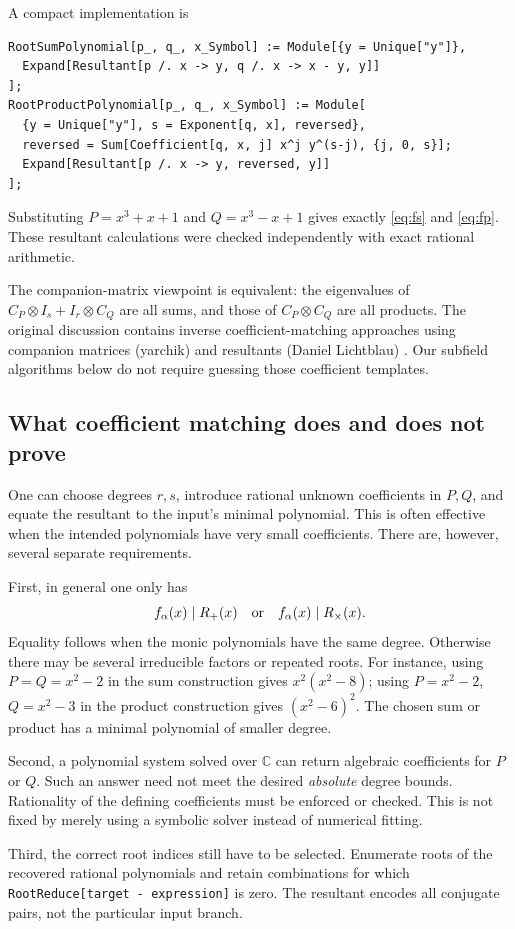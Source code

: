 \documentclass[11pt,letterpaper]{article}
\theoremstyle{definition}
\theoremstyle{remark}
\newcommand{\C}{\mathbb C}
\newcommand{\wl}[1]{\texttt{#1}}
\begin{document}
A compact implementation is
\begin{lstlisting}
RootSumPolynomial[p_, q_, x_Symbol] := Module[{y = Unique["y"]},
  Expand[Resultant[p /. x -> y, q /. x -> x - y, y]]
];
RootProductPolynomial[p_, q_, x_Symbol] := Module[
  {y = Unique["y"], s = Exponent[q, x], reversed},
  reversed = Sum[Coefficient[q, x, j] x^j y^(s-j), {j, 0, s}];
  Expand[Resultant[p /. x -> y, reversed, y]]
];
\end{lstlisting}
Substituting \(P=x^3+x+1\) and \(Q=x^3-x+1\) gives exactly
\eqref{eq:fs} and \eqref{eq:fp}. These resultant calculations were checked
independently with exact rational arithmetic.

The companion-matrix viewpoint is equivalent: the eigenvalues of
\(C_P\otimes I_s+I_r\otimes C_Q\) are all sums, and those of
\(C_P\otimes C_Q\) are all products. The original discussion contains
inverse coefficient-matching approaches using companion matrices
(yarchik) and resultants (Daniel Lichtblau) \cite{sequestion}.
Our subfield algorithms below do not require guessing those coefficient
templates.

\subsection{What coefficient matching does and does not prove}
One can choose degrees \(r,s\), introduce rational unknown coefficients in
\(P,Q\), and equate the resultant to the input's minimal polynomial. This
is often effective when the intended polynomials have very small
coefficients. There are, however, several separate requirements.

First, in general one only has
\[
 f_\alpha(x)\mid R_+(x)\quad\hbox{or}\quad f_\alpha(x)\mid R_\times(x).
\]
Equality follows when the monic polynomials have the same degree. Otherwise
there may be several irreducible factors or repeated roots. For instance,
using \(P=Q=x^2-2\) in the sum construction gives
\(x^2(x^2-8)\); using \(P=x^2-2\), \(Q=x^2-3\) in the product
construction gives \((x^2-6)^2\). The chosen sum or product has a minimal
polynomial of smaller degree.

Second, a polynomial system solved over \(\C\) can return algebraic
coefficients for \(P\) or \(Q\). Such an answer need not meet the desired
\emph{absolute} degree bounds. Rationality of the defining coefficients
must be enforced or checked. This is not fixed by merely using a
symbolic solver instead of numerical fitting.

Third, the correct root indices still have to be selected. Enumerate roots
of the recovered rational polynomials and retain combinations for which
\wl{RootReduce[target - expression]} is zero. The resultant encodes all
conjugate pairs, not the particular input branch.
\end{document}
